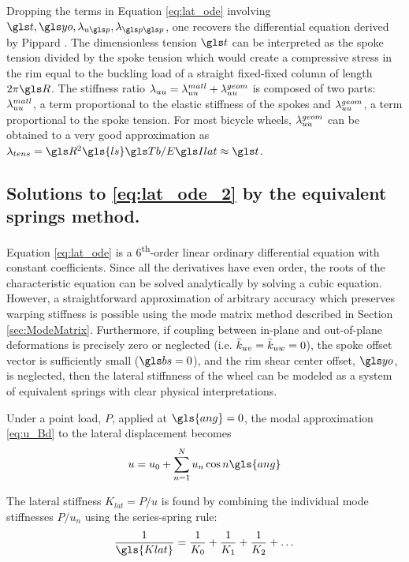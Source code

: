 \documentclass[\rootdir/thesis.tex]{subfiles}
\begin{document}
Dropping the terms in Equation \eqref{eq:lat_ode} involving $\ts, \yo, \lr_{u\p}, \lr_{\p\p}$, one recovers the differential equation derived by Pippard \cite{Pippard1932a}. The dimensionless tension $\ts$ can be interpreted as the spoke tension divided by the spoke tension which would create a compressive stress in the rim equal to the buckling load of a straight fixed-fixed column of length $2\pi \R$. The stiffness ratio $\lambda_{uu}=\lambda_{uu}^{matl}+\lambda_{uu}^{geom}$ is composed of two parts: $\lambda_{uu}^{matl}$, a term proportional to the elastic stiffness of the spokes and $\lambda_{uu}^{geom}$, a term proportional to the spoke tension. For most bicycle wheels, $\lambda_{uu}^{geom}$ can be obtained to a very good approximation as $\lr_{tens} = \R^2\gls{ls}\Tb/\EIl \approx \ts$.

\subsection{Solutions to \eqref{eq:lat_ode_2} by the equivalent springs method.}
\label{sec:equiv_springs}

Equation \eqref{eq:lat_ode} is a 6\textsuperscript{th}-order linear ordinary differential equation with constant coefficients. Since all the derivatives have even order, the roots of the characteristic equation can be solved analytically by solving a cubic equation. However, a straightforward approximation of arbitrary accuracy which preserves warping stiffness is possible using the mode matrix method described in Section \ref{sec:ModeMatrix}. Furthermore, if coupling between in-plane and out-of-plane deformations is precisely zero or neglected (i.e. $\bar{k}_{uv} = \bar{k}_{uw} = 0$), the spoke offset vector is sufficiently small ($\bs=0$), and the rim shear center offset, $\yo$, is neglected, then the lateral stiffnness of the wheel can be modeled as a system of equivalent springs with clear physical interpretations.

Under a point load, $P$, applied at $\gls{ang}=0$, the modal approximation \eqref{eq:u_Bd} to the lateral displacement becomes
\begin{equation}
\label{eq:u_kequiv}
u = u_0 + \sum_{n=1}^N u_n \cos{n\gls{ang}}
\end{equation}

The lateral stiffness $K_{lat}=P/u$ is found by combining the individual mode stiffnesses $P/u_n$ using the series-spring rule:
\begin{equation}
\label{eq:Klat_series}
\frac{1}{\gls{Klat}} = \frac{1}{K_0} + \frac{1}{K_1} + \frac{1}{K_2} + \dots
\end{equation}
\end{document}
